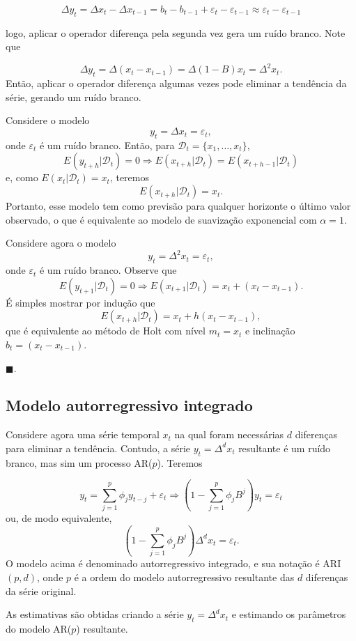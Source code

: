 \documentclass[
  letterpaper,
  DIV=11,
  numbers=noendperiod]{scrartcl}
\theoremstyle{plain}
\theoremstyle{plain}
\theoremstyle{definition}
\theoremstyle{definition}
\theoremstyle{remark}
\begin{document}
\[\Delta y_t= \Delta x_t - \Delta x_{t-1}=b_t-b_{t-1}+\varepsilon_t-\varepsilon_{t-1}\approx \varepsilon_t-\varepsilon_{t-1}\]

logo, aplicar o operador diferença pela segunda vez gera um ruído
branco. Note que

\[\Delta y_t=\Delta (x_t-x_{t-1})=\Delta(1-B)x_t=\Delta^2 x_t.\] Então,
aplicar o operador diferença algumas vezes pode eliminar a tendência da
série, gerando um ruído branco.

\leavevmode{}%
Considere o modelo \[y_t=\Delta x_t=\varepsilon_t,\] onde
\(\varepsilon_t\) é um ruído branco. Então, para
\(\mathcal{D}_t=\{x_1,\ldots,x_t\}\),
\[E(y_{t+h}|\mathcal{D}_t)=0\Rightarrow E(x_{t+h}|\mathcal{D}_t)=E(x_{t+h-1}|\mathcal{D}_t)\]
e, como \(E(x_t|\mathcal{D}_t)=x_t\), teremos
\[E(x_{t+h}|\mathcal{D}_t)=x_t.\] Portanto, esse modelo tem como
previsão para qualquer horizonte o último valor observado, o que é
equivalente ao modelo de suavização exponencial com \(\alpha=1\).

Considere agora o modelo \[y_t=\Delta^2 x_t=\varepsilon_t,\] onde
\(\varepsilon_t\) é um ruído branco. Observe que
\[E(y_{t+1}|\mathcal{D}_t)=0\Rightarrow E(x_{t+1}|\mathcal{D}_t)=x_t + (x_t-x_{t-1}).\]
É simples mostrar por indução que
\[E(x_{t+h}|\mathcal{D}_t)=x_t+ h(x_t-x_{t-1}),\] que é equivalente ao
método de Holt com nível \(m_t=x_t\) e inclinação \(b_t=(x_t-x_{t-1})\).

\(\blacksquare\).

\hypertarget{modelo-autorregressivo-integrado}{%
\subsection{Modelo autorregressivo
integrado}\label{modelo-autorregressivo-integrado}}

Considere agora uma série temporal \(x_t\) na qual foram necessárias
\(d\) diferenças para eliminar a tendência. Contudo, a série
\(y_t=\Delta^d x_t\) resultante é um ruído branco, mas sim um processo
AR(\(p\)). Teremos

\[y_t=\sum_{j=1}^p \phi_j y_{t-j}+\varepsilon_t \Rightarrow \left(1-\sum_{j=1}^p \phi_jB^j\right)y_t=\varepsilon_t\]
ou, de modo equivalente,
\[\left(1-\sum_{j=1}^p \phi_jB^j\right)\Delta^d x_t=\varepsilon_t.\] O
modelo acima é denominado autorregressivo integrado, e sua notação é
ARI\((p,d)\), onde \(p\) é a ordem do modelo autorregressivo resultante
das \(d\) diferenças da série original.

As estimativas são obtidas criando a série \(y_t=\Delta^d x_t\) e
estimando os parâmetros do modelo AR(\(p\)) resultante.
\end{document}

